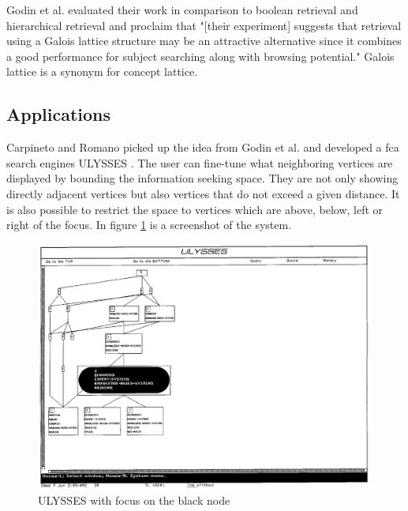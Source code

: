 \documentclass[11pt]{report}
\begin{document}
{{Godin et al. \cite{Godin1993} evaluated their work in comparison to boolean retrieval and hierarchical retrieval and proclaim that "[their experiment] suggests that retrieval using a Galois lattice structure may be an attractive alternative since it combines a good performance for subject searching along with browsing potential." Galois lattice is a synonym for concept lattice.\\

\subsection{Applications}

Carpineto and Romano picked up the idea from Godin et al. and developed a \acrshort{fca} search engines ULYSSES \cite{Carpineto1995,Carpineto1996}. The user can fine-tune what neighboring vertices are displayed by bounding the information seeking space. They are not only showing directly adjacent vertices but also vertices that do not exceed a given distance. It is also possible to restrict the space to vertices which are above, below, left or right of the focus. In figure \ref{figure:ulysses} is a screenshot of the system. \\

\begin{figure}[!ht]
	\centering
	\includegraphics[width=\linewidth]{images/ulysses}
\caption{ULYSSES with focus on the black node \cite{Carpineto1996} }
\label{figure:ulysses}
\end{figure}

}}
\end{document}

